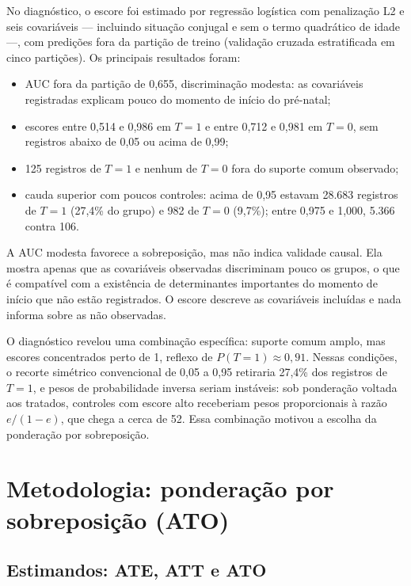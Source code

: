 \documentclass[11pt,a4paper]{article}
\begin{document}
No diagnóstico, o escore foi estimado por regressão logística com penalização L2 e seis
covariáveis --- incluindo situação conjugal e sem o termo quadrático de idade ---, com
predições fora da partição de treino (validação cruzada estratificada em cinco partições).
Os principais resultados foram:
\begin{itemize}
\item AUC fora da partição de 0,655, discriminação modesta: as covariáveis registradas
explicam pouco do momento de início do pré-natal;
\item escores entre 0,514 e 0,986 em $T=1$ e entre 0,712 e 0,981 em $T=0$, sem registros
abaixo de 0,05 ou acima de 0,99;
\item 125 registros de $T=1$ e nenhum de $T=0$ fora do suporte comum observado;
\item cauda superior com poucos controles: acima de 0,95 estavam 28.683 registros de $T=1$
(27,4\% do grupo) e 982 de $T=0$ (9,7\%); entre 0,975 e 1,000, 5.366 contra 106.
\end{itemize}

A AUC modesta favorece a sobreposição, mas não indica validade causal. Ela mostra apenas
que as covariáveis observadas discriminam pouco os grupos, o que é compatível com a
existência de determinantes importantes do momento de início que não estão registrados. O
escore descreve as covariáveis incluídas e nada informa sobre as não observadas.

O diagnóstico revelou uma combinação específica: suporte comum amplo, mas escores
concentrados perto de 1, reflexo de $P(T=1) \approx 0{,}91$. Nessas condições, o recorte
simétrico convencional de 0,05 a 0,95 retiraria 27,4\% dos registros de $T=1$, e pesos
de probabilidade inversa seriam instáveis: sob ponderação voltada aos tratados, controles
com escore alto receberiam pesos proporcionais à razão $e/(1-e)$, que chega a cerca de 52.
Essa combinação motivou a escolha da ponderação por sobreposição.

\section{Metodologia: ponderação por sobreposição (ATO)}\label{sec:ato}

\subsection{Estimandos: ATE, ATT e ATO}
\end{document}
